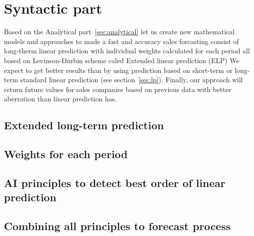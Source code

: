 
\chapter{Syntactic part} \label{sec:methodology}
Based on the Analytical part~\ref{sec:analytical} let us create new mathematical models and approaches to made a fast and accuracy sales forcasting
consist of long-therm linear prediction with individual weights calculated for each period all based on Levinson-Durbin scheme caled Extended linear prediction (ELP)
We expect to get better results than by using prediction based on short-term or long-term standard linear prediction (see section~\ref{sec:lp}).
Finally, our approach will return future values for sales companies based on previous data with better aberration than linear prediction has.
\section{Extended long-term prediction} \label{sec:models}
\section{Weights for each period} \label{sec:models}
\section{AI principles to detect best order of linear prediction} \label{sec:models}
\section{Combining all principles to forecast process} \label{subsec:combining_models}